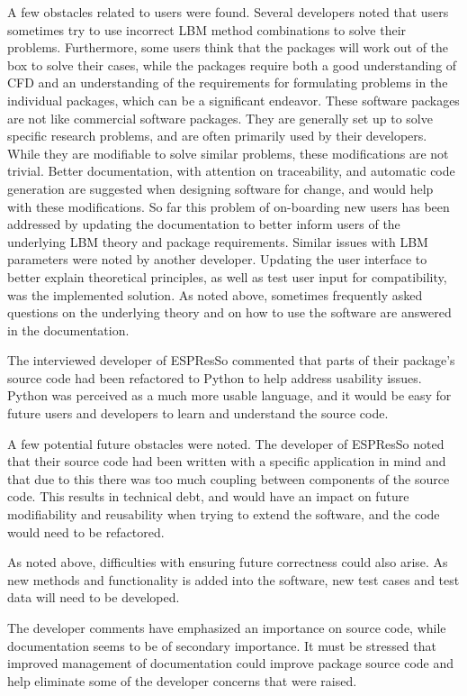 \documentclass[12pt, notitlepage]{article}
\begin{document}
A few obstacles related to users were found. Several developers noted that users sometimes try to use incorrect LBM method combinations to solve their problems. Furthermore, some users think that the packages will work out of the box to solve their cases, while the packages require both a good understanding of CFD and an understanding of the requirements for formulating problems in the individual packages, which can be a significant endeavor. These software packages are not like commercial software packages. They are generally set up to solve specific research problems, and are often primarily used by their developers. While they are modifiable to solve similar problems, these modifications are not trivial. Better documentation, with attention on traceability, and automatic code generation are suggested when designing software for change, and would help with these modifications. So far this problem of on-boarding new users has been addressed by updating the documentation to better inform users of the underlying LBM theory and package requirements. Similar issues with LBM parameters were noted by another developer. Updating the user interface to better explain theoretical principles, as well as test user input for compatibility, was the implemented solution. As noted above, sometimes frequently asked questions on the underlying theory and on how to use the software are answered in the documentation.

The interviewed developer of ESPResSo commented that parts of their package's source code had been refactored to Python to help address usability issues. Python was perceived as a much more usable language, and it would be easy for future users and developers to learn and understand the source code. 

A few potential future obstacles were noted. The developer of ESPResSo noted that their source code had been written with a specific application in mind and that due to this there was too much coupling between components of the source code. This results in technical debt, and would have an impact on future modifiability and reusability when trying to extend the software, and the code would need to be refactored.

As noted above, difficulties with ensuring future correctness could also arise. As new methods and functionality is added into the software, new test cases and test data will need to be developed.

The developer comments have emphasized an importance on source code, while documentation seems to be of secondary importance. It must be stressed that improved management of documentation could improve package source code and help eliminate some of the developer concerns that were raised.  
\end{document}

